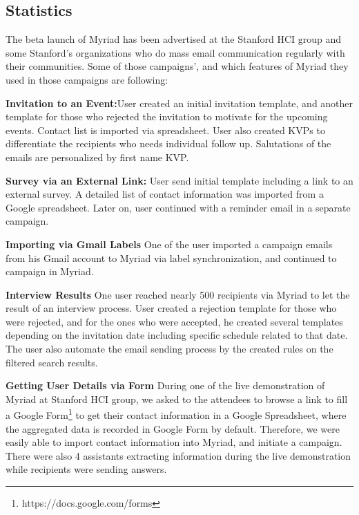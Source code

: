 \subsection{Statistics}
\label{subsec:5.4.1:Stat}

The beta launch of Myriad has been advertised at the Stanford \ac{HCI} group and some Stanford's organizations who do mass email communication regularly with their communities. Some of those campaigns', and which features of Myriad they used in those campaigns are following:

\begin{compactitem}
	\item \textbf{Invitation to an Event:}User created an initial invitation template, and another template for those who rejected the invitation to motivate for the upcoming events.  Contact list is imported via spreadsheet. User also created \ac{KVP}s to differentiate the recipients who needs individual follow up. Salutations of the emails are personalized by first name \ac{KVP}.
	\item \textbf{Survey via an External Link:} User send initial template including a link to an external survey. A detailed list of contact information was imported from a Google spreadsheet. Later on, user continued with a reminder email in a separate campaign.
	\item \textbf{Importing via Gmail Labels} One of the user imported a campaign emails from his Gmail account to Myriad via label synchronization, and continued to campaign in Myriad.
	\item \textbf{Interview Results} One user reached nearly 500 recipients via Myriad to let the result of an interview process. User created a rejection template for those who were rejected, and for the ones who were accepted, he created several templates depending on the invitation date including specific schedule related to that date. The user also automate the email sending process by the created rules on the filtered search results.
	\item \textbf{Getting User Details via Form} During one of the live demonstration of Myriad at Stanford \ac{HCI} group, we asked to the attendees to browse a link to fill a Google Form\footnote{https://docs.google.com/forms} to get their contact information in a Google Spreadsheet, where the aggregated data is recorded in Google Form by default. Therefore, we were easily able to import contact information into Myriad, and initiate a campaign. There were also 4 assistants extracting information during the live demonstration while recipients were sending answers.
\end{compactitem}
\vspace{1cm}

